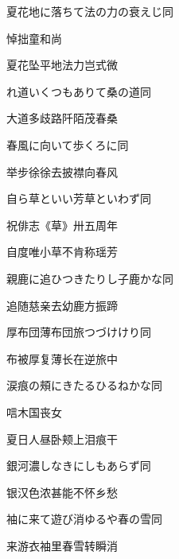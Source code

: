\begin{haiku}
    {\FH 夏花地に落ちて法の力の衰えじ}\hfill{\FH 同}

    {\FK 悼拙童和尚}

    {\FK 夏花坠平地法力岂式微}
\end{haiku}

\begin{haiku}
    {\FH {}れ道いくつもありて桑の道}\hfill{\FH 同}

    {\FK 大道多歧路阡陌茂春桑}
\end{haiku}

\begin{haiku}
    {\FH 春風に向いて歩くろに}\hfill{\FH 同}

    {\FK 举步徐徐去披襟向春风}
\end{haiku}

\begin{haiku}
    {\FH 自ら草といい芳草といわず}\hfill{\FH 同}

    {\FK 祝俳志《草》卅五周年}

    {\FK 自度唯小草不肯称瑶芳}
\end{haiku}

\begin{haiku}
    {\FH 親鹿に追ひつきたりし子鹿かな}\hfill{\FH 同}

    {\FK 追随慈亲去幼鹿方振蹄}
\end{haiku}

\begin{haiku}
    {\FH 厚布団薄布団旅つづけけり}\hfill{\FH 同}

    {\FK 布被厚复薄长在逆旅中}
\end{haiku}

\begin{haiku}
    {\FH 涙痕の頰にきたるひるねかな}\hfill{\FH 同}

    {\FK 唁木国丧女}

    {\FK 夏日人昼卧颊上泪痕干}
\end{haiku}

\begin{haiku}
    {\FH 銀河濃しなきにしもあらず}\hfill{\FH 同}

    {\FK 银汉色浓甚能不怀乡愁}
\end{haiku}

\begin{haiku}
    {\FH 袖に来て遊び消ゆるや春の雪}\hfill{\FH 同}

    {\FK 来游衣袖里春雪转瞬消}
\end{haiku}

